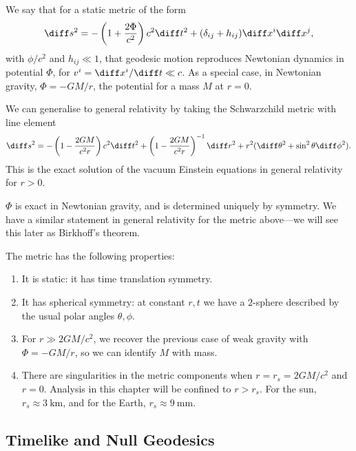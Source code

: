 \documentclass[12pt]{article}
\begin{document}
We say that for a static metric of the form
\[
\diff s^2 = - \left(1 + \frac{2 \Phi}{c^2} \right)c^2 \diff t^2 + (\delta_{ij} + h_{ij}) \diff x^i \diff x^j,
\]
with $\phi/c^2$ and $h_{ij} \ll 1$, that geodesic motion reproduces Newtonian dynamics in potential $\Phi$, for $v^i = \diff x^i / \diff t \ll c$. As a special case, in Newtonian gravity, $\Phi = - GM/r$, the potential for a mass $M$ at $r = 0$.

We can generalise to general relativity by taking the Schwarzchild metric with line element
\[
\diff s^2 = - \left(1 - \frac{2 GM}{c^2 r} \right) c^2 \diff t^2 + \left(1 - \frac{2 GM}{c^2 r} \right)^{-1} \diff r^2 + r^2(\diff \theta^2 + \sin^2 \theta \diff \phi^2).
\]
This is the exact solution of the vacuum Einstein equations in general relativity for $r > 0$.

$\Phi$ is exact in Newtonian gravity, and is determined uniquely by symmetry. We have a similar statement in general relativity for the metric above---we will see this later as Birkhoff's theorem.


The metric has the following properties:
\begin{enumerate}
	\item It is static: it has time translation symmetry.
	\item It has spherical symmetry: at constant $r, t$ we have a $2$-sphere described by the usual polar angles $\theta, \phi$.
	\item For $r \gg 2GM/c^2$, we recover the previous case of weak gravity with $\Phi = -GM/r$, so we can identify $M$ with mass.
	\item There are singularities in the metric components when $r = r_s = 2GM/c^2$ and $r = 0$. Analysis in this chapter will be confined to $r > r_s$. For the sun, $r_s \approx \qty{3}{\kilo\metre}$, and for the Earth, $r_s \approx \qty{9}{\milli\metre}$.
\end{enumerate}

\subsection{Timelike and Null Geodesics}
\label{sub:tim_null_schw}
\end{document}
